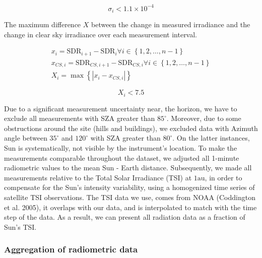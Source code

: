 \documentclass[
  preprint, 3p, authoryear]{article}
\begin{document}
\begin{equation}
\sigma_i < \ensuremath{1.1\times 10^{-4}}
\label{eq:VCTcr}
\end{equation}

The maximum difference \(X\) between the change in measured irradiance and the change in clear sky
irradiance over each measurement interval.

\begin{gather}
x_i = \text{SDR}_{i+1} - \text{SDR}_{i} \forall i \in \left \{ 1, 2, \ldots, n-1 \right \} \label{eq:VSM1} \\
x_{CS,i} = \text{SDR}_{CS,i+1} - \text{SDR}_{CS,i} \forall i \in \left \{ 1, 2, \ldots, n-1 \right \} \label{eq:VSM2} \\
X_i = \max{\left \{ \left | x_i - x_{CS,i} \right | \right \}} \label{eq:VSM3}
\end{gather}

\begin{equation}
X_i < 7.5
\label{eq:VSMcr}
\end{equation}

Due to a significant measurement uncertainty near, the horizon, we have to exclude
all measurements with SZA greater than \(85^\circ\).
Moreover, due to some obstructions around the site (hills and buildings), we excluded data with Azimuth angle between
\(35^\circ\) and \(120^\circ\) with SZA greater than \(80^\circ\).
On the latter instances, Sun is systematically, not visible by the instrument's location.
To make the measurements comparable throughout the dataset, we adjusted all 1-minute radiometric values to the mean Sun - Earth distance.
Subsequently, we made all measurements relative to the Total Solar Irradiance (TSI) at \(1 \text{au}\), in order to compensate for the Sun's intensity variability, using a homogenized time series of satellite TSI observations.
The TSI data we use, comes from NOAA (Coddington et al. 2005), it overlaps with our data, and is interpolated to match with the time step of the data.
As a result, we can present all radiation data as a fraction of Sun's TSI.

\hypertarget{aggregation-of-radiometric-data}{%
\subsubsection{Aggregation of radiometric data}\label{aggregation-of-radiometric-data}}
\end{document}
